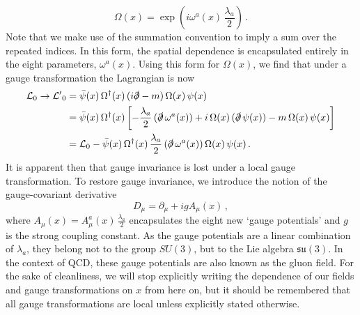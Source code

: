 %
\begin{equation}
\Omega(x)=\exp\left(i\omega^a(x)\,\frac{\lambda_a}{2}\right)\, .
\label{eq:LocalGaugeTransformation}
\end{equation}
%
Note that we make use of the summation convention to imply a sum over the repeated indices. In this form, the spatial dependence is encapsulated entirely in the eight parameters, $\omega^a(x)$.  Using this form for $\Omega(x)$, we find that under a gauge transformation the Lagrangian is now
%
\begin{align}
\mathcal{L}_0\rightarrow\mathcal{L^\prime}_0&=\bar{\psi}(x)\,\Omega^\dag(x)\,(i\slashed{\partial}-m)\,\Omega(x)\,\psi(x)\nonumber\\
&=\bar{\psi}(x)\,\Omega^\dag(x)\left[-\frac{\lambda_a}{2}\,(\slashed{\partial}\,\omega^a(x))+i\,\Omega(x)\,(\slashed{\partial}\,\psi(x))-m\,\Omega(x)\,\psi(x)\right]\nonumber\\
&= \mathcal{L}_0-\bar{\psi}(x)\,\Omega^\dag(x)\,\frac{\lambda_a}{2}\,(\slashed{\partial}\,\omega^a(x))\,\Omega(x)\,\psi(x)\, .
\label{eq:LocalTrans}
\end{align}
%
It is apparent then that gauge invariance is lost under a local gauge transformation. To restore gauge invariance, we introduce the notion of the gauge-covariant derivative
%
\begin{equation}
D_\mu = \partial_\mu + ig A_\mu(x)\, ,
\label{eq:CovariantDerivative}
\end{equation}
%
where $A_\mu(x)=A_\mu^a(x)\,\frac{\lambda_a}{2}$ encapsulates the eight new `gauge potentials' and $g$ is the strong coupling constant. As the gauge potentials are a linear combination of $\lambda_a$, they belong not to the group $SU(3)$, but to the Lie algebra $\mathfrak{su}(3)$. In the context of QCD, these gauge potentials are also known as the gluon field. For the sake of cleanliness, we will stop explicitly writing the dependence of our fields and gauge transformations on $x$ from here on, but it should be remembered that all gauge transformations are local unless explicitly stated otherwise.\\


